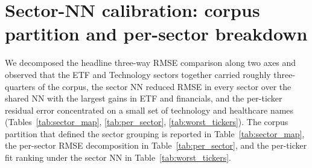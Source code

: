 \section{Sector-NN calibration: corpus partition and per-sector breakdown}\label{sec:supp_sector_nn}

We decomposed the headline three-way RMSE comparison along two axes and observed that the ETF and Technology sectors together carried roughly three-quarters of the corpus, the sector NN reduced RMSE in every sector over the shared NN with the largest gains in ETF and financials, and the per-ticker residual error concentrated on a small set of technology and healthcare names (Tables~\ref{tab:sector_map}, \ref{tab:per_sector}, \ref{tab:worst_tickers}). The corpus partition that defined the sector grouping is reported in Table~\ref{tab:sector_map}, the per-sector RMSE decomposition in Table~\ref{tab:per_sector}, and the per-ticker fit ranking under the sector NN in Table~\ref{tab:worst_tickers}.

\begin{table}[ht]
\centering
\caption{Sector partition of the 31-ticker ladder. Each ticker appeared on at least one of fifteen capture dates (2026-04-14 through 2026-05-11); per-sector observation counts were pooled across dates. ETF observation counts were substantially larger than other sectors because SPY, QQQ, and IWM carried far deeper strike ladders than individual-name chains.}\label{tab:sector_map}
\end{table}

